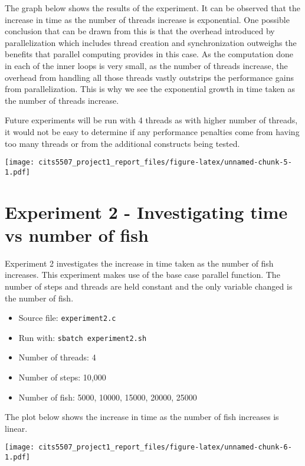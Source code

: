 \documentclass[
]{article}
\providecommand{\tightlist}{%
  \setlength{\itemsep}{0pt}\setlength{\parskip}{0pt}}
\begin{document}
The graph below shows the results of the experiment. It can be observed
that the increase in time as the number of threads increase is
exponential. One possible conclusion that can be drawn from this is that
the overhead introduced by parallelization which includes thread
creation and synchronization outweighs the benefits that parallel
computing provides in this case. As the computation done in each of the
inner loops is very small, as the number of threads increase, the
overhead from handling all those threads vastly outstrips the
performance gains from parallelization. This is why we see the
exponential growth in time taken as the number of threads increase.

Future experiments will be run with 4 threads as with higher number of
threads, it would not be easy to determine if any performance penalties
come from having too many threads or from the additional constructs
being tested.

\texttt{[image: cits5507\_project1\_report\_files/figure-latex/unnamed-chunk-5-1.pdf]}
\newpage

\hypertarget{experiment-2---investigating-time-vs-number-of-fish}{%
\section{Experiment 2 - Investigating time vs number of
fish}\label{experiment-2---investigating-time-vs-number-of-fish}}

Experiment 2 investigates the increase in time taken as the number of
fish increases. This experiment makes use of the base case parallel
function. The number of steps and threads are held constant and the only
variable changed is the number of fish.

\begin{itemize}
\tightlist
\item
  Source file: \texttt{experiment2.c}
\item
  Run with: \texttt{sbatch\ experiment2.sh}
\item
  Number of threads: 4
\item
  Number of steps: 10,000
\item
  Number of fish: 5000, 10000, 15000, 20000, 25000
\end{itemize}

The plot below shows the increase in time as the number of fish
increases is linear.

\texttt{[image: cits5507\_project1\_report\_files/figure-latex/unnamed-chunk-6-1.pdf]}
\newpage
\end{document}
